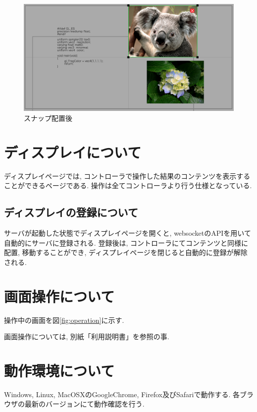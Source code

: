 \documentclass[a4paper,10pt,oneside]{jsbook}
\begin{document}
\begin{figure}[htbp]
	\begin{center}
		\includegraphics[width=11.5cm]{image/fitafter.png}
	\end{center}
	\caption{スナップ配置後}
	\label{fig:fitafter}
\end{figure}

\chapter{ディスプレイについて}
ディスプレイページでは, コントローラで操作した結果のコンテンツを表示することができるページである. 操作は全てコントローラより行う仕様となっている.

\section{ディスプレイの登録について}
サーバが起動した状態でディスプレイページを開くと, websocketのAPIを用いて自動的にサーバに登録される. 登録後は, コントローラにてコンテンツと同様に配置, 移動することができ, ディスプレイページを閉じると自動的に登録が解除される. 

\chapter{画面操作について}

操作中の画面を図\ref{fig:operation}に示す. 

画面操作については, 別紙「利用説明書」を参照の事.


\chapter{動作環境について}
Windows, Linux, MacOSXのGoogleChrome, Firefox及びSafariで動作する.
各ブラウザの最新のバージョンにて動作確認を行う.
\end{document}
